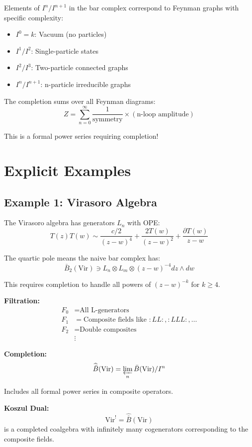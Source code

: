 \begin{remark}\label{rem:feynman-conilpotent}
Elements of $I^n/I^{n+1}$ in the bar complex correspond to Feynman graphs with specific complexity:

\begin{itemize}
\item $I^0 = k$: Vacuum (no particles)
\item $I^1/I^2$: Single-particle states
\item $I^2/I^3$: Two-particle connected graphs
\item $I^n/I^{n+1}$: n-particle irreducible graphs
\end{itemize}

The completion sums over all Feynman diagrams:
$$Z = \sum_{n=0}^{\infty} \frac{1}{\text{symmetry}} \times (\text{n-loop amplitude})$$

This is a formal power series requiring completion!
\end{remark}

\section{Explicit Examples}

\subsection{Example 1: Virasoro Algebra}

\begin{example}\label{ex:virasoro-completion}
The Virasoro algebra has generators $L_n$ with OPE:
$$T(z)T(w) \sim \frac{c/2}{(z-w)^4} + \frac{2T(w)}{(z-w)^2} + \frac{\partial T(w)}{z-w}$$

The quartic pole means the naive bar complex has:
$$\bar{B}_2(\text{Vir}) \ni L_n \otimes L_m \otimes (z-w)^{-4} dz \wedge dw$$

This requires completion to handle all powers of $(z-w)^{-k}$ for $k \geq 4$.

\textbf{Filtration:}
\begin{align*}
F_0 &= \text{All L-generators} \\
F_1 &= \text{Composite fields like } :LL:, :LLL:, \ldots \\
F_2 &= \text{Double composites} \\
&\vdots
\end{align*}

\textbf{Completion:}
$$\widehat{\bar{B}}(\text{Vir}) = \varprojlim_n \bar{B}(\text{Vir})/I^n$$

Includes all formal power series in composite operators.

\textbf{Koszul Dual:}
$$\text{Vir}^! = \widehat{\bar{B}}(\text{Vir})$$
is a completed coalgebra with infinitely many cogenerators corresponding to the composite fields.
\end{example}

